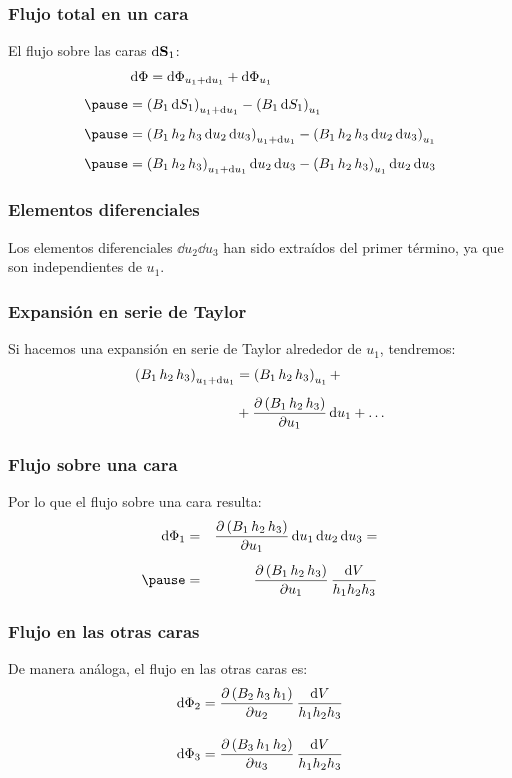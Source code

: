 \documentclass[12pt]{beamer}
\begin{document}
\begin{frame}
\frametitle{Flujo total en un cara}
El flujo sobre las caras $\dd{\vb{S}_{1}}$:
\pause
\begin{eqnarray*}
\begin{aligned}
&\dd{\Phi} = \dd{\Phi_{u_{1} + \dd{u_{1}}}} + \dd{\Phi_{u_{1}}} \\[0.5em] \pause
&= \left( B_{1} \dd{S_{1}} \right)_{u_{1} + \dd{u_{1}}} - \left( B_{1} \dd{S_{1}} \right)_{u_{1}} \\[0.5em] \pause
&= \left( B_{1} \, h_{2} \, h_{3} \dd{u_{2}} \dd{u_{3}} \right)_{u_{1} + \dd{u_{1}}} - \left( B_{1} \, h_{2} \, h_{3} \dd{u_{2}} \dd{u_{3}} \right)_{u_{1}} \\[0.5em] \pause
&= \left( B_{1} \, h_{2} \, h_{3} \right)_{u_{1} + \dd{u_{1}}} \dd{u_{2}} \dd{u_{3}} - \left( B_{1} \, h_{2} \, h_{3} \right)_{u_{1}} \dd{u_{2}} \dd{u_{3}}
\end{aligned}
\end{eqnarray*}
\end{frame} 
\begin{frame}
\frametitle{Elementos diferenciales}
Los elementos diferenciales $\dd{u_{2}} \dd{u_{3}}$ han sido extraídos del primer término, ya que son independientes de $u_{1}$.
\end{frame}
\begin{frame}
\frametitle{Expansión en serie de Taylor}
Si hacemos una expansión en serie de Taylor alrededor de $u_{1}$, tendremos:
\pause
\begin{align*}
\left( B_{1} \, h_{2} \, h_{3} \right)_{u_{1} + \dd{u_{1}}} &= \left( B_{1} \, h_{2} \, h_{3} \right)_{u_{1}} + \\[0.5em]
&+ \pdv{\left( B_{1} \, h_{2} \, h_{3} \right)}{u_{1}} \dd{u_{1}} + \ldots
\end{align*}
\end{frame}
\begin{frame}
\frametitle{Flujo sobre una cara}
Por lo que el flujo sobre una cara resulta:
\pause
\begin{eqnarray*}
\dd{\Phi_{1}} &=& \pdv{\left( B_{1} \, h_{2} \, h_{3} \right)}{u_{1}} \dd{u_{1}} \dd{u_{2}} \dd{u_{3}} = \\[0.5em] \pause
&=& \pdv{\left( B_{1} \, h_{2} \, h_{3} \right)}{u_{1}} \, \dfrac{\dd{V}}{h_{1} h_{2} h_{3}}
\end{eqnarray*}
\end{frame}
\begin{frame}
\frametitle{Flujo en las otras caras}
De manera análoga, el flujo en las otras caras es:
\pause
\begin{align*}
\dd{\Phi_{2}} &= \pdv{\left( B_{2} \, h_{3} \, h_{1} \right)}{u_{2}} \, \dfrac{\dd{V}}{h_{1} h_{2} h_{3}} \\[1em]
\dd{\Phi_{3}} &= \pdv{\left( B_{3} \, h_{1} \, h_{2} \right)}{u_{3}} \, \dfrac{\dd{V}}{h_{1} h_{2} h_{3}}
\end{align*}
\end{frame}
\end{document}
